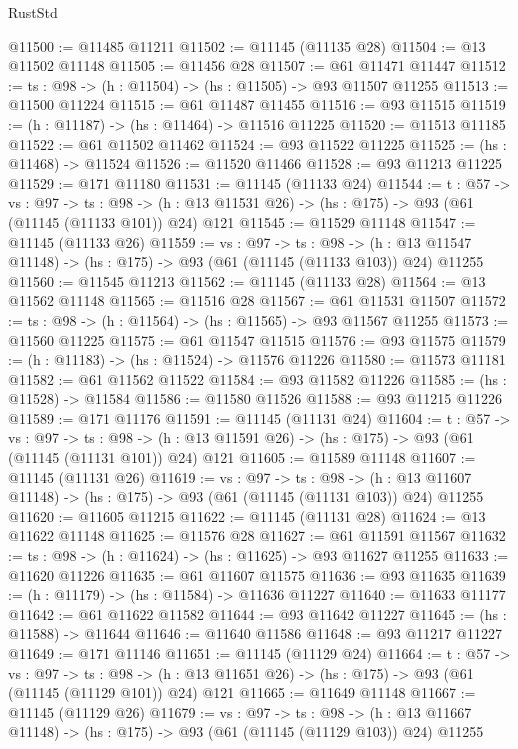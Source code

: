 \begin{lexlean}{RustStd}
\begin{coremodule}
@11500 := @11485 @11211
@11502 := @11145 (@11135 @28)
@11504 := @13 @11502 @11148
@11505 := @11456 @28
@11507 := @61 @11471 @11447
@11512 := {ts : @98} -> (h : @11504) -> (hs : @11505) -> @93 @11507 @11255
@11513 := @11500 @11224
@11515 := @61 @11487 @11455
@11516 := @93 @11515
@11519 := (h : @11187) -> (hs : @11464) -> @11516 @11225
@11520 := @11513 @11185
@11522 := @61 @11502 @11462
@11524 := @93 @11522 @11225
@11525 := (hs : @11468) -> @11524
@11526 := @11520 @11466
@11528 := @93 @11213 @11225
@11529 := @171 @11180
@11531 := @11145 (@11133 @24)
@11544 := {t : @57} ->
  {vs : @97} ->
  {ts : @98} -> (h : @13 @11531 @26) -> (hs : @175) -> @93 (@61 (@11145 (@11133 @101)) @24) @121
@11545 := @11529 @11148
@11547 := @11145 (@11133 @26)
@11559 := {vs : @97} ->
  {ts : @98} ->
  (h : @13 @11547 @11148) -> (hs : @175) -> @93 (@61 (@11145 (@11133 @103)) @24) @11255
@11560 := @11545 @11213
@11562 := @11145 (@11133 @28)
@11564 := @13 @11562 @11148
@11565 := @11516 @28
@11567 := @61 @11531 @11507
@11572 := {ts : @98} -> (h : @11564) -> (hs : @11565) -> @93 @11567 @11255
@11573 := @11560 @11225
@11575 := @61 @11547 @11515
@11576 := @93 @11575
@11579 := (h : @11183) -> (hs : @11524) -> @11576 @11226
@11580 := @11573 @11181
@11582 := @61 @11562 @11522
@11584 := @93 @11582 @11226
@11585 := (hs : @11528) -> @11584
@11586 := @11580 @11526
@11588 := @93 @11215 @11226
@11589 := @171 @11176
@11591 := @11145 (@11131 @24)
@11604 := {t : @57} ->
  {vs : @97} ->
  {ts : @98} -> (h : @13 @11591 @26) -> (hs : @175) -> @93 (@61 (@11145 (@11131 @101)) @24) @121
@11605 := @11589 @11148
@11607 := @11145 (@11131 @26)
@11619 := {vs : @97} ->
  {ts : @98} ->
  (h : @13 @11607 @11148) -> (hs : @175) -> @93 (@61 (@11145 (@11131 @103)) @24) @11255
@11620 := @11605 @11215
@11622 := @11145 (@11131 @28)
@11624 := @13 @11622 @11148
@11625 := @11576 @28
@11627 := @61 @11591 @11567
@11632 := {ts : @98} -> (h : @11624) -> (hs : @11625) -> @93 @11627 @11255
@11633 := @11620 @11226
@11635 := @61 @11607 @11575
@11636 := @93 @11635
@11639 := (h : @11179) -> (hs : @11584) -> @11636 @11227
@11640 := @11633 @11177
@11642 := @61 @11622 @11582
@11644 := @93 @11642 @11227
@11645 := (hs : @11588) -> @11644
@11646 := @11640 @11586
@11648 := @93 @11217 @11227
@11649 := @171 @11146
@11651 := @11145 (@11129 @24)
@11664 := {t : @57} ->
  {vs : @97} ->
  {ts : @98} -> (h : @13 @11651 @26) -> (hs : @175) -> @93 (@61 (@11145 (@11129 @101)) @24) @121
@11665 := @11649 @11148
@11667 := @11145 (@11129 @26)
@11679 := {vs : @97} ->
  {ts : @98} ->
  (h : @13 @11667 @11148) -> (hs : @175) -> @93 (@61 (@11145 (@11129 @103)) @24) @11255

\end{coremodule}
\end{lexlean}
